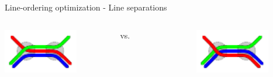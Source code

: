 \documentclass{beamer}
\begin{document}
\begin{frame}[t]{Line-ordering optimization - Line separations}	
	\begin{columns}[T]
		\begin{column}[T]{0.45\textwidth}
			\centering \includegraphics[width=0.7\textwidth]{figures/splitting_example_nonopt.pdf}




			\vspace{1.05cm}

		\end{column}
		\begin{column}[T]{0.1\textwidth}
			\vspace{1.05cm}
			\centering vs.

		\end{column}
		\begin{column}[T]{0.45\textwidth}			
			\centering \includegraphics[width=0.7\textwidth]{figures/splitting_example.pdf}


\end{column}
\end{columns}
\end{frame}
\end{document}
